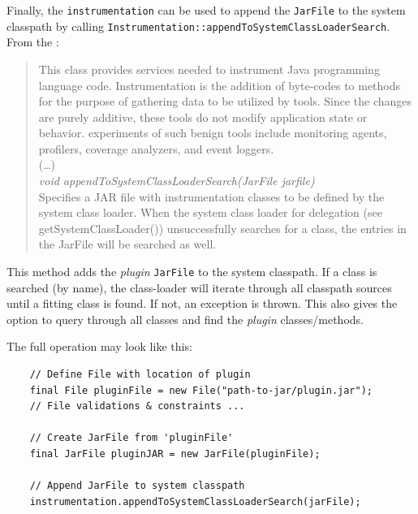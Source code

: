 Finally, the \lstinline{instrumentation} can be used to append the \lstinline{JarFile} to the system classpath by calling \lstinline{Instrumentation::appendToSystemClassLoaderSearch}.
From the \textcite{javadoc:instrumentation}:
\begin{quote}
    This class provides services needed to instrument Java programming language code. Instrumentation is the addition of byte-codes to methods for the purpose of gathering data to be utilized by tools. Since the changes are purely additive, these tools do not modify application state or behavior. experiments of such benign tools include monitoring agents, profilers, coverage analyzers, and event loggers.
    \\
    (\dots)
    \\
    \textit{void appendToSystemClassLoaderSearch(JarFile jarfile)}\\
    Specifies a JAR file with instrumentation classes to be defined by the system class loader. When the system class loader for delegation (see getSystemClassLoader()) unsuccessfully searches for a class, the entries in the JarFile will be searched as well.
\end{quote}
This method adds the \textit{plugin} \lstinline{JarFile} to the system classpath.
If a class is searched (by name), the class-loader will iterate through all classpath sources until a fitting class is found.
If not, an exception is thrown.
This also gives the option to query through all classes and find the \textit{plugin} classes/methods.

The full operation may look like this:
\begin{lstlisting}
    // Define File with location of plugin
    final File pluginFile = new File("path-to-jar/plugin.jar");
    // File validations & constraints ...

    // Create JarFile from 'pluginFile'
    final JarFile pluginJAR = new JarFile(pluginFile);

    // Append JarFile to system classpath
    instrumentation.appendToSystemClassLoaderSearch(jarFile);
\end{lstlisting}